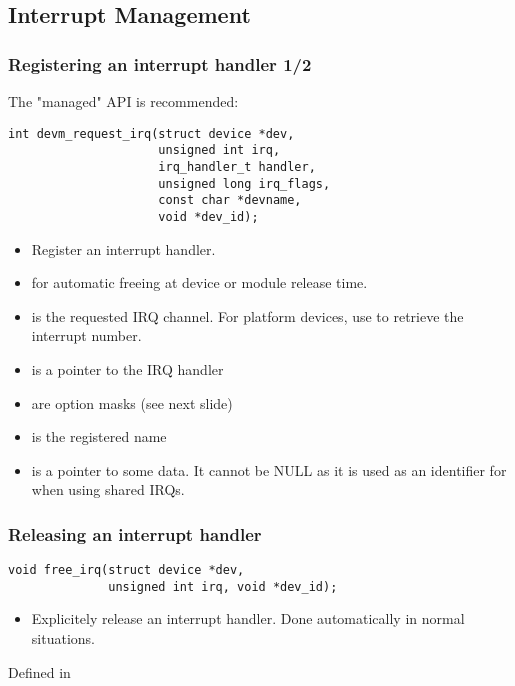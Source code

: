 \subsection{Interrupt Management}

\begin{frame}[fragile]
  \frametitle{Registering an interrupt handler 1/2}
  The "managed" API is recommended:
  \begin{verbatim}
int devm_request_irq(struct device *dev,
                     unsigned int irq,
                     irq_handler_t handler,
                     unsigned long irq_flags,
                     const char *devname,
                     void *dev_id);
  \end{verbatim}
  \begin{itemize}
  \item Register an interrupt handler.
  \item {} for automatic freeing at device or module
        release time.
  \item {} is the requested IRQ channel. For platform
        devices, use  to retrieve the
        interrupt number.
  \item {} is a pointer to the IRQ handler
  \item {} are option masks (see next slide)
  \item {} is the registered name
  \item {} is a pointer to some data. It cannot be NULL
        as it is used as an identifier for  when using
        shared IRQs.
  \end{itemize}
\end{frame}

\begin{frame}[fragile]
  \frametitle{Releasing an interrupt handler}
  \begin{verbatim}
void free_irq(struct device *dev,
              unsigned int irq, void *dev_id);
  \end{verbatim}
  \begin{itemize}
  \item Explicitely release an interrupt handler. Done automatically
        in normal situations.
  \end{itemize}
  Defined in 
\end{frame}

